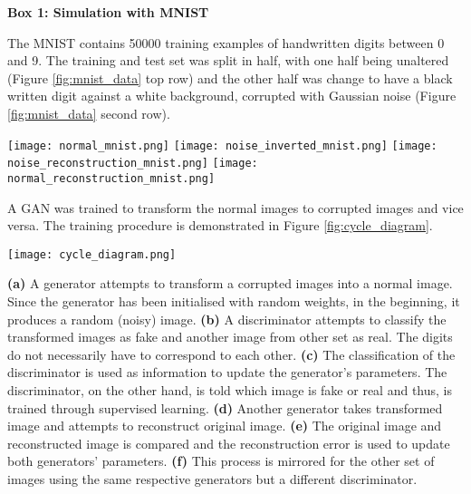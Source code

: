   \begin{mdframed}[backgroundcolor=blue!20]
      \begin{Large}
      \textbf{Box 1: Simulation with MNIST} \\
      \end{Large}
  The MNIST contains 50000 training examples of handwritten digits between 0 and 9. The training and test set was split in half, with one half being unaltered (Figure \ref{fig:mnist_data} top row) and the other half was change to have a black written digit against a white background, corrupted with Gaussian noise (Figure \ref{fig:mnist_data} second row).

  \begin{center}
     \begin{minipage}{\linewidth}
     \centering
     \texttt{[image: normal\_mnist.png]}
  \texttt{[image: noise\_inverted\_mnist.png]}
  \texttt{[image: noise\_reconstruction\_mnist.png]}
   \texttt{[image: normal\_reconstruction\_mnist.png]}
     \label{fig:mnist_data}
     \end{minipage}
  \end{center}
  A GAN was trained to transform the normal images to corrupted images and vice versa. The training procedure is demonstrated in Figure \ref{fig:cycle_diagram}.
  \begin{center}
     \begin{minipage}{\linewidth}
     \centering
   \texttt{[image: cycle\_diagram.png]}
    \label{fig:cycle_diagram}
     \end{minipage}
  \end{center}
  \textbf{(a)} A generator attempts to transform a corrupted images into a normal image. Since the generator has been initialised with random weights, in the beginning, it produces a random (noisy) image. \textbf{(b)} A discriminator attempts to classify the transformed images as fake and another image from other set as real. The digits do not necessarily have to correspond to each other.
  \textbf{(c)} The classification of the discriminator is used as information to update the generator's parameters. The discriminator, on the other hand, is told which image is fake or real and thus, is trained through supervised learning. \textbf{(d)} Another generator takes transformed image and attempts to reconstruct original image. \textbf{(e)} The original image and reconstructed image is compared and the reconstruction error is used to update both generators' parameters. \textbf{(f)} This process is mirrored for the other set of images using the same respective generators but a different discriminator.


\end{mdframed}
